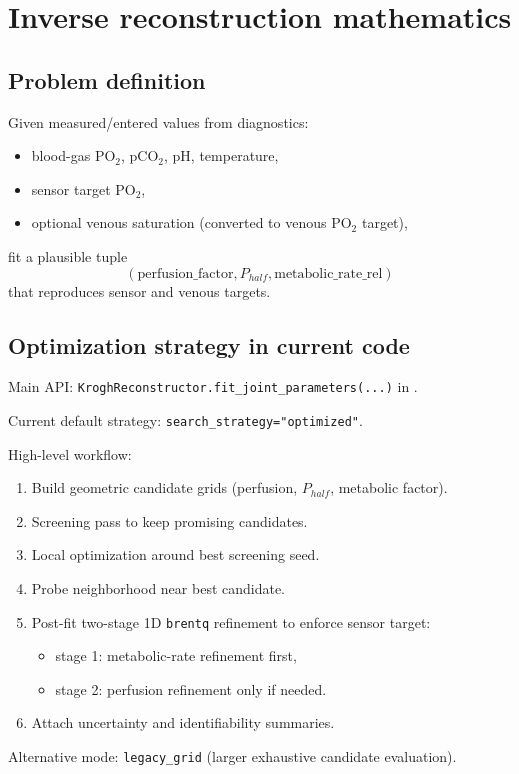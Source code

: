 \documentclass[12pt,a4paper]{article}
\begin{document}
\section{Inverse reconstruction mathematics}
\subsection{Problem definition}
Given measured/entered values from diagnostics:
\begin{itemize}
    \item blood-gas PO$_2$, pCO$_2$, pH, temperature,
    \item sensor target PO$_2$,
    \item optional venous saturation (converted to venous PO$_2$ target),
\end{itemize}
fit a plausible tuple
\[
(\text{perfusion\_factor}, P_{half}, \text{metabolic\_rate\_rel})
\]
that reproduces sensor and venous targets.

\subsection{Optimization strategy in current code}
Main API: \texttt{KroghReconstructor.fit\_joint\_parameters(...)} in .

Current default strategy: \texttt{search\_strategy="optimized"}.

High-level workflow:
\begin{enumerate}
    \item Build geometric candidate grids (perfusion, $P_{half}$, metabolic factor).
    \item Screening pass to keep promising candidates.
    \item Local optimization around best screening seed.
    \item Probe neighborhood near best candidate.
    \item Post-fit two-stage 1D \texttt{brentq} refinement to enforce sensor target:
    \begin{itemize}
        \item stage 1: metabolic-rate refinement first,
        \item stage 2: perfusion refinement only if needed.
    \end{itemize}
    \item Attach uncertainty and identifiability summaries.
\end{enumerate}

Alternative mode: \texttt{legacy\_grid} (larger exhaustive candidate evaluation).
\end{document}

